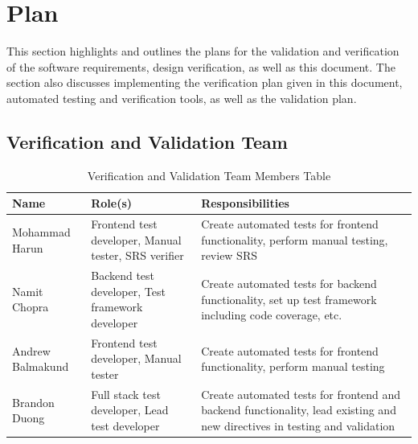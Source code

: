 \documentclass[12pt, titlepage]{article}
\begin{document}

\section{Plan}
This section highlights and outlines the plans for the validation and verification of the software requirements, design verification, as well as this document. The section also discusses implementing the verification plan given in this document, automated testing and verification tools, as well as the validation plan.

\subsection{Verification and Validation Team}

\begin{table}[H]
\caption{Verification and Validation Team Members Table}
\begin{adjustwidth}{-2cm}{-2cm}
\centering
\begin{tabular}{|l|p{1.8in}|p{2.5in}|}
\hline
\textbf{Name}            & \textbf{Role(s)}                                       & \textbf{Responsibilities}                                                                                                                                             \\ \hline
Mohammad Harun           & Frontend test developer, Manual tester, SRS verifier               & Create automated tests for frontend functionality, perform manual testing, review SRS                                                                                              \\ \hline
Namit Chopra             & Backend test developer, Test framework developer       & Create automated tests for backend functionality, set up test framework including code coverage, etc.                                                                 \\ \hline
Andrew Balmakund         & Frontend test developer, Manual tester                 & Create automated tests for frontend functionality, perform manual testing                                                                                             \\ \hline
Brandon Duong            & Full stack test developer, Lead test developer         & Create automated tests for frontend and backend functionality, lead existing and new directives in testing and validation                                             \\ \hline

\end{tabular}
\end{adjustwidth}
\end{table}
\end{document}
